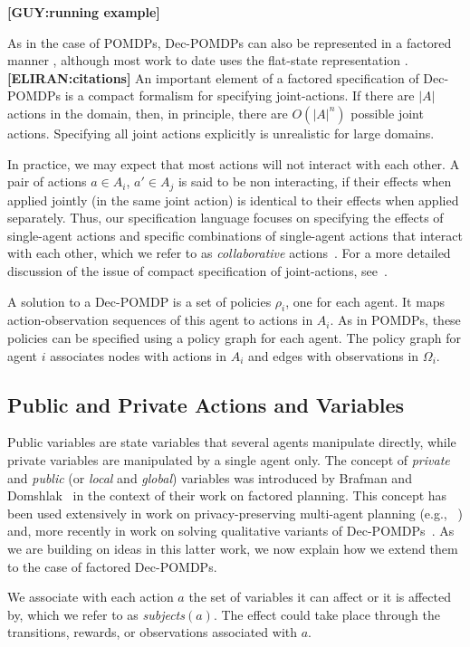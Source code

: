 \documentclass[letterpaper]{article} %
\newcommand{\eliran}[1]{\textbf{[\color{red}ELIRAN:#1]}}
\newcommand{\guy}[1]{\textbf{[\color{orange}GUY:#1]}}
\begin{document}
\guy{running example}

As in the case of POMDPs, Dec-POMDPs can also be represented in a factored manner \cite{}, although most work to date uses the flat-state representation \cite{}.\eliran{citations}
An important element of a factored specification of Dec-POMDPs is a compact formalism for specifying joint-actions. If there are $|A|$ actions in the domain, then, in principle, there are $O(|A|^n)$ possible joint actions. Specifying all joint actions explicitly is unrealistic for large domains. 

In practice, we may expect
that most actions will not interact with each other. A pair of actions $a\in A_i$, $a' \in A_j$ is said to be non interacting, if their effects when applied jointly (in the same joint action) is identical to their effects when applied separately.
Thus, our specification language focuses on specifying
the effects of single-agent actions and specific
combinations of single-agent actions that interact with each other, which we refer to as {\em collaborative} actions~\cite{}. For a more detailed discussion of the issue
of compact specification of joint-actions, see~\cite{}. 


A solution to a Dec-POMDP is a set of policies $\rho_i$, one for each agent. It maps action-observation sequences of this agent to actions in $A_i$.
As in POMDPs, these policies can be specified using a policy graph for each agent. The policy graph for agent $i$ associates nodes with actions in $A_i$
and edges with observations in $\Omega_i$. 

\subsection{Public and Private Actions and Variables}

Public variables are state variables that several agents manipulate directly, while private variables are manipulated by a single agent only. 
The concept of \emph{private} and \emph{public} (or \emph{local} and \emph{global}) variables was introduced by
Brafman and Domshlak~\cite{} in the context of their work on factored planning. This concept has been used extensively
in work on privacy-preserving multi-agent planning (e.g., ~\cite{}) and, more recently in work on solving qualitative variants of Dec-POMDPs~\cite{}. As we are building on ideas in this latter work, we now explain how we extend them to the
case of factored Dec-POMDPs.

We associate with each action $a$ the set of variables it can affect or it is affected by, which we refer to as  {\em subjects}$(a)$. 
The effect could take place through the transitions, rewards, or observations associated with $a$.
\end{document}
